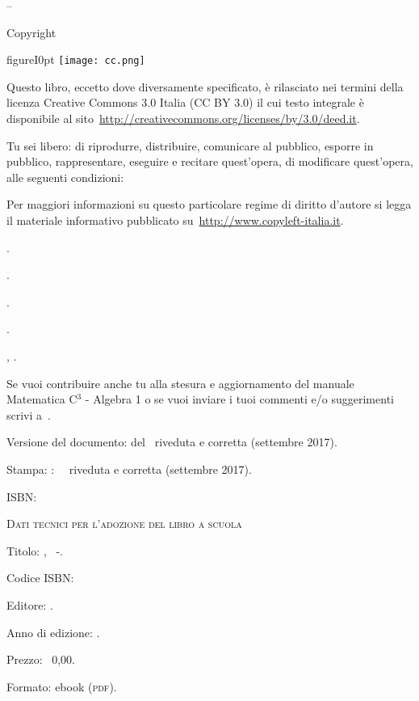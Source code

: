 \thispagestyle{empty}
{\setlength{\parindent}{0em}\small{
\begin{center}
{\large{\serie – \titolo}}

Copyright {\textcopyright} {\anno} \editore
\end{center}

\begin{wrapfloat}{figure}{I}{0pt}
\texttt{[image: cc.png]}
\end{wrapfloat}

Questo libro, eccetto dove diversamente specificato, è rilasciato nei termini 
della licenza Creative Commons 3.0 Italia
(CC BY 3.0) il cui testo integrale è disponibile al 
sito~\url{http://creativecommons.org/licenses/by/3.0/deed.it}.

Tu sei libero:
di riprodurre, distribuire, comunicare al pubblico, esporre in pubblico, rappresentare,
eseguire e recitare quest'opera, di modificare quest'opera, alle seguenti condizioni:

 Per maggiori informazioni su questo particolare regime di diritto d'autore si
legga il materiale informativo pubblicato su~\url{http://www.copyleft-italia.it}.

 \coord .

 \autori.

 \colab.

 {\texautori}.

 {\texcol, \texautori}.

 Se vuoi contribuire anche tu alla stesura e aggiornamento
del manuale Matematica C$^3$ - Algebra 1 o se vuoi inviare i tuoi commenti e/o suggerimenti scrivi
a~.

\vspace{2ex}
 Versione del documento: {\docvers} del {\oggi}~riveduta e corretta (settembre 2017).

 Stampa: \edizione : \mese\ \anno~riveduta e corretta (settembre 2017).

 ISBN: \mcisbn

\vspace{2ex}
 {\scshape{Dati tecnici per l'adozione del libro a scuola}}

 Titolo: \serie, \titolo\ -\edizione.

 Codice ISBN: \mcisbn

 Editore: \href{http://www.matematicamente.it}{\editore}.

 Anno di edizione: \anno.

 Prezzo: \officialeuro\ 0,00.

 Formato: ebook (\scshape{pdf}).
}}
\cleardoublepage
